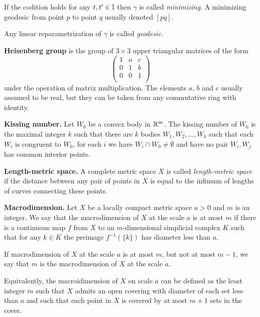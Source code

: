 \begin{description}
If the codition holds for any $t,t'\in\mathbb{I}$ then $\gamma$ is called \emph{minimizing}.
A minimizing geodesic from point $p$ to point $q$ usually denoted $[pq]$.

Any linear reparametrization of $\gamma$ is called \emph{geodesic}.

\item{\bf Heisenberg group}\label{Heisenberg group}
is the group of $3\times3$ upper triangular matrices of the form
\[\begin{pmatrix}
 1 & a & c\\
 0 & 1 & b\\
 0 & 0 & 1\\
\end{pmatrix}\]
under the operation of matrix multiplication. The elements $a$, $b$ and $c$ usually assumed to be real,
but they can be taken from any commutative ring with identity.

\item{\bf Kissing number.}\label{Kissing number}
Let  $W_0$ be a convex body in $\mathbb{R}^m$.
The kissing number of $W_0$ is the maximal integer $k$ such that there are $k$ bodies $W_1,W_2,\dots,W_k$ such that each $W_i$ is congruent to $W_0$,
for each $i$ we have $W_i\cap W_0\not=\emptyset$ and have no pair $W_i,W_j$ has common interior points.

\item{\bf  Length-metric space.}\label{Length-metric space} 
A complete metric space $X$ is called {\it length-metric space}  if the distance between any pair of points in $X$ is equal to the infimum of lengths of curves connecting these points. 

\item{\bf Macrodimension.}\label{Macrodimension}
Let $X$ be a locally compact metric space $a>0$ and $m$ is an integer.
We say that the macrodimension  of $X$ at the scale $a$ is at most $m$
if there is a continuous map $f$ from $X$ to an $m$-dimensional simplicial complex $K$
such that for any $k\in K$ the preimage $f^{-1}(\{k\})$ has diameter less than $a$.

If macrodimension of $X$ at the scale $a$ is at most $m$,
but not at most $m-1$, 
we say that $m$ is the macrodimension of $X$ at the scale $a$.

Equivalently, the macroidimension of $X$ on scale $a$ can be defined as 
the least integer $m$ such that $X$ admits an open covering with diameter of each set less than $a$ 
and such that each point in $X$ is covered by at most $m+1$ sets in the cover.



\end{description}
